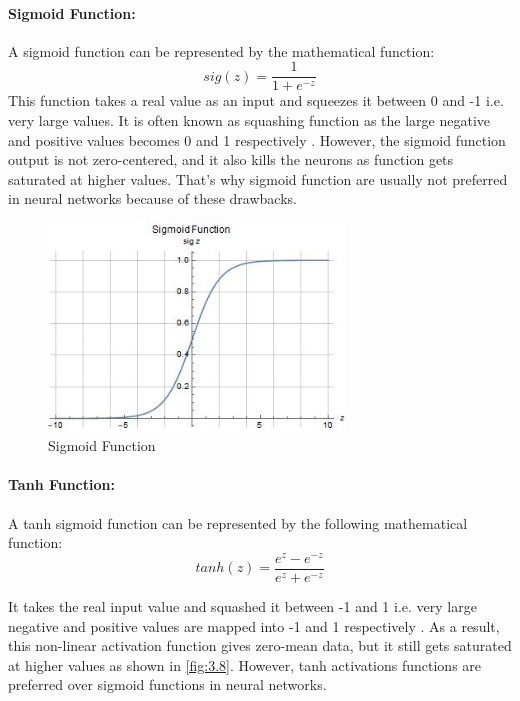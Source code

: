 \paragraph*{Sigmoid Function:}
A sigmoid function can be represented by the mathematical function:
\begin{equation}
	sig(z) = \frac{1}{1+e^{-z}}
\end{equation}
This function takes a real value as an input and squeezes 
it between 0 and -1 i.e. very large values. It is often known 
as squashing function as the large negative and positive 
values becomes 0 and 1 respectively \cite{chap_3_article:5} . However, the sigmoid function 
output is not zero-centered, and it also kills the neurons as function 
gets saturated at higher values. That’s why sigmoid function are usually 
not preferred in neural networks because of these drawbacks.

\begin{figure}[H]
	\centering
		\includegraphics[width=0.70\textwidth]{CHAPTERS/Chapter-3/Images/3.7.jpg}
	\caption{Sigmoid Function}
	\label{fig:3.7}
\end{figure}
\paragraph*{Tanh Function:}
A tanh sigmoid function can be represented by the following mathematical function:
\begin{equation}
	tanh(z) = \frac{e^{z}-e^{-z}}{e^{z}+e^{-z}}
\end{equation}

It takes the real input value and squashed it between -1 and 1 i.e. very 
large negative and positive values are mapped into -1 and 1 respectively \cite{chap_3_article:5}. As 
a result, this non-linear activation function gives zero-mean data, but it 
still gets saturated at higher values as shown in \ref{fig:3.8}. However, tanh 
activations functions are preferred over sigmoid functions in neural networks.

